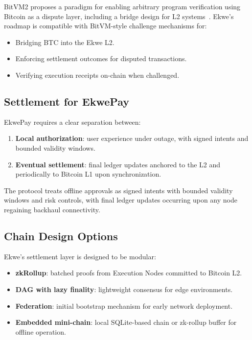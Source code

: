 \documentclass[11pt,a4paper]{article}
\begin{document}
BitVM2 proposes a paradigm for enabling arbitrary program verification using Bitcoin as a dispute layer, including a bridge design for L2 systems~\cite{bitvm2}. Ekwe's roadmap is compatible with BitVM-style challenge mechanisms for:
\begin{itemize}[nosep]
  \item Bridging BTC into the Ekwe L2.
  \item Enforcing settlement outcomes for disputed transactions.
  \item Verifying execution receipts on-chain when challenged.
\end{itemize}

\subsection{Settlement for EkwePay}

EkwePay requires a clear separation between:
\begin{enumerate}[nosep]
  \item \textbf{Local authorization}: user experience under outage, with signed intents and bounded validity windows.
  \item \textbf{Eventual settlement}: final ledger updates anchored to the L2 and periodically to Bitcoin L1 upon synchronization.
\end{enumerate}

The protocol treats offline approvals as signed intents with bounded validity windows and risk controls, with final ledger updates occurring upon any node regaining backhaul connectivity.

\subsection{Chain Design Options}

Ekwe's settlement layer is designed to be modular:
\begin{itemize}[nosep]
  \item \textbf{zkRollup}: batched proofs from Execution Nodes committed to Bitcoin L2.
  \item \textbf{DAG with lazy finality}: lightweight consensus for edge environments.
  \item \textbf{Federation}: initial bootstrap mechanism for early network deployment.
  \item \textbf{Embedded mini-chain}: local SQLite-based chain or zk-rollup buffer for offline operation.
\end{itemize}
\end{document}
